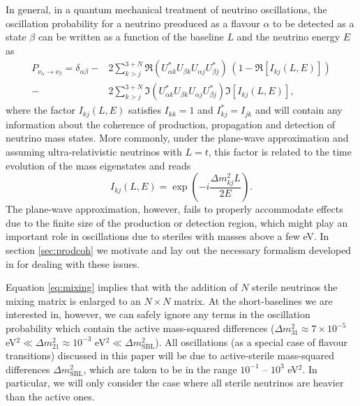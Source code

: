 In general, in a quantum mechanical treatment of neutrino oscillations, the oscillation probability for a neutrino preoduced as a flavour $\alpha$ to be detected as a state $\beta$ can be written as a function of the baseline $L$ and the neutrino energy $E$ as
%
%
\begin{align} \label{eq:general_prob}
P_{\nu_{\alpha} \to \nu_{\beta}}= \delta_{\alpha \beta} -& 2 \sum_{k>j}^{3+N} \Re(U_{\alpha k}^* U_{\beta k} U_{\alpha j} U_{\beta j}^*)\, \left(1 - \Re\left[I_{k j}(L, E)\right]\right) \nonumber\\ -& 2\sum_{k>j}^{3+N} \Im(U_{\alpha k}^* U_{\beta k} U_{\alpha j} U_{\beta j}^*) \Im\left[I_{k j}(L, E) \right],
\end{align}
where the factor $I_{k j}(L, E)$ satisfies $I_{k k} = 1$ and $I^*_{k j} = I_{j k}$ \cite{Akhmedov2009} and will contain any information about the coherence of production, propagation and detection of neutrino mass states. More commonly, under the plane-wave approximation and assuming ultra-relativistic neutrinos with $L = t$, this factor is related to the time evolution of the mass eigenstates and reads
%
\begin{equation} \label{eq:Iplanewave}
I_{k j}(L, E) = \exp\left(-i \frac{\Delta m^2_{k j} L}{2 E}\right).
\end{equation}
%
The plane-wave approximation, however, fails to properly accommodate effects due to the finite size of the production or detection region, which might play an important role in oscillations due to steriles with masses above a few eV. In section \ref{sec:prodcoh} we motivate and lay out the necessary formalism developed in \cite{Akhmedov2009,Akhmedov2012} for dealing with these issues.

Equation \ref{eq:mixing} implies that with the addition of $N$ sterile neutrinos the mixing matrix is enlarged to an $N \times N$ matrix. At the short-baselines we are interested in, however, we can safely ignore any terms in the oscillation probability which contain the active mass-squared differences ($\Delta m^2_{31} \approx 7 \times 10^{-5}$ eV$^2 \ll\Delta m^2_{21} \approx 10^{-3}$ eV$^2 \ll \Delta m^2_{\text{SBL}}$). All oscillations (as a special case of flavour transitions) discussed in this paper will be due to active-sterile mass-squared differences $\Delta m^2_{\text{SBL}}$, which are taken to be in the range $10^{-1}$ -- $10^{3}$ eV$^2$. In particular, we will only consider the case where all sterile neutrinos are heavier than the active ones.   

